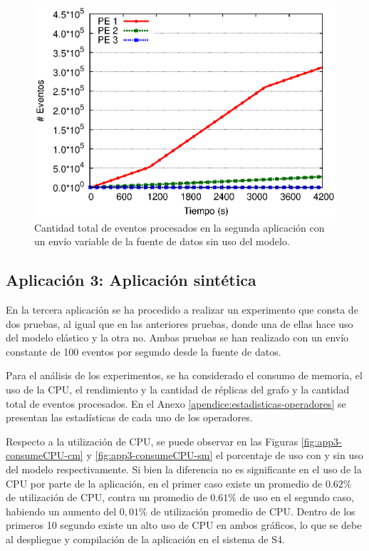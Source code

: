 \begin{figure}[!ht]
	\centering
    \includegraphics[scale=0.7]{images/exp/app2/normal/sm/eventCount.eps}
    \caption{Cantidad total de eventos procesados en la segunda aplicación con un envío variable de la fuente de datos sin uso del modelo.}
    \label{fig:app2-normal-eventCount-sm}
\end{figure}

\subsection{Aplicación 3: Aplicación sintética}
En la tercera aplicación se ha procedido a realizar un experimento que consta de dos pruebas, al igual que en las anteriores pruebas, donde una de ellas hace uso del modelo elástico y la otra no. Ambas pruebas se han realizado con un envío constante de 100 eventos por segundo desde la fuente de datos.

Para el análisis de los experimentos, se ha considerado el consumo de memoria, el uso de la CPU, \normalsize{el rendimiento y la cantidad de réplicas del grafo} y la cantidad total de eventos procesados. En el Anexo \ref{apendice:estadisticas-operadores} \normalsize{se presentan las estadísticas de cada uno de los operadores.}


Respecto a la utilización de CPU, se puede observar en las Figuras \ref{fig:app3-consumeCPU-cm} y \ref{fig:app3-consumeCPU-sm} el porcentaje de uso con y sin uso del modelo respectivamente. Si bien la diferencia no es significante en el uso de la CPU por parte de la aplicación, en el primer caso existe un promedio de $0.62\%$ de utilización de CPU, contra un promedio de $0.61\%$ de uso en el segundo caso, habiendo un aumento del $0,01\%$ de utilización promedio de CPU. Dentro de los primeros 10 segundo existe un alto uso de CPU en ambos gráficos, lo que se debe al despliegue y compilación de la aplicación en el sistema de S4.

